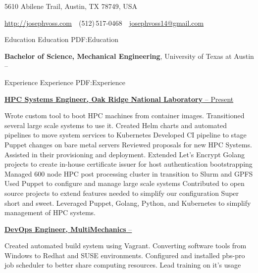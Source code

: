 \documentclass[letterpaper,MMMyyyy,nonstopmode]{simpleresumecv}
\newcommand{\CVAuthor}{Joseph Voss}
\newcommand{\CVWebpage}{http://josephvoss.com}
\begin{document}

\Title{\CVAuthor}

\begin{SubTitle}
{5610 Abilene Trail, Austin, TX 78749, USA}
\par
\href{\CVWebpage}
{\url{\CVWebpage}}
\,\SubBulletSymbol\,
(512)\,517-0468
\,\SubBulletSymbol\,
\href{mailto:josephvoss14@gmail.com}
{josephvoss14@gmail.com}

\end{SubTitle}

\begin{Body}

\BigGap

\Section
{Education}
{Education}
{PDF:Education}

\Entry
{\textbf{Bachelor of Science, Mechanical Engineering}},
University of Texas at Austin
\hfill
{} --


\Section
{Experience}
{Experience}
{PDF:Experience}
\Entry

\href{http://olcf.ornl.gov}
{\textbf{HPC Systems Engineer, Oak Ridge National Laboratory}
  \hfill {} -- Present}
\Gap
\begin{Detail}
\BulletItem
Wrote custom tool to boot HPC machines from container images. Transitioned
  several large scale systems to use it.
\BulletItem
Created Helm charts and automated pipelines to move system services to
  Kubernetes
\BulletItem
Developed CI pipeline to stage Puppet changes on bare metal servers
\BulletItem
Reviewed proposals for new HPC Systems. Assisted in their provisioning and
  deployment.
\BulletItem
Extended Let's Encrypt Golang projects to create in-house certificate issuer for
  host authentication bootstrapping
\BulletItem
Managed 600 node HPC post processing cluster in transition to Slurm and GPFS
\BulletItem
Used Puppet to configure and manage large scale systems
\BulletItem
Contributed to open source projects to extend features needed to simplify our
  configuration
\BulletItem
Super short and sweet. Leveraged Puppet, Golang, Python, and Kubernetes to
  simplify management of HPC systems.

\end{Detail}

\BigGap 
\Entry
\href{http://multimechanics.com}
{\textbf{DevOps Engineer, MultiMechanics}
  \hfill
   --
   }
\Gap
\begin{Detail}
\BulletItem
Created automated build system using Vagrant. Converting software tools from
  Windows to Redhat and SUSE environments.
\BulletItem
Configured and installed pbs-pro job scheduler to better share computing
    \newline resources. Lead training on it's usage
\end{Detail}


\end{Body}
\end{document}
